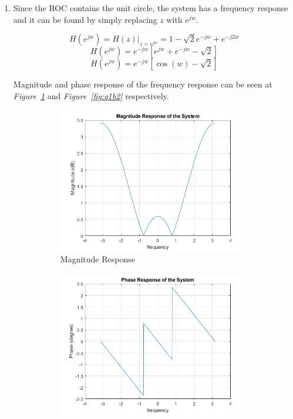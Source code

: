 \documentclass[a4paper,12pt]{article}
\begin{document}
\begin{enumerate}
\begin{enumerate}
 			\item Since the ROC contains the unit circle, the system has a frequency response and it can be found by simply replacing $z$ with $e^{jw}$.
 			
 			$$	H(e^{jw})=H(z)|_{z=e^{jw}} = 1-\sqrt{2} e^{-jw}+e^{-j2w} $$
 			$$ H(e^{jw})=  e^{-jw}[	 e^{jw}+ e^{-jw}-\sqrt{2}]$$
 			$$\boxed {H(e^{jw})= e^{-jw}\left[\cos(w)-\sqrt{2}\right]} $$
 			
 			Magnitude and phase response of the frequency response can be seen at \textit{Figure~\ref{fig:q1b1}} and \textit{Figure~\ref{fig:q1b2}} respectively.
 			
 					
			\begin{figure}[H]
	 			\setlength{\unitlength}{\textwidth} 
 				\centering
				\begin{subfigure}{.5\textwidth}
  					\centering
  					\includegraphics[width=0.48\unitlength]{images/Q1b1k}
  					\caption{\label{fig:q1b1}Magnitude Response }
				\end{subfigure}%
				\begin{subfigure}{.5\textwidth}
  					\centering
					\includegraphics[width=0.48\unitlength]{images/Q1b2k}

\end{subfigure}
\end{figure}
\end{enumerate}
\end{enumerate}
\end{document}
